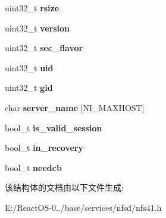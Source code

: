 \begin{DoxyCompactItemize}
uint32\+\_\+t {\bfseries rsize}
\item 
\mbox{\label{struct____nfs41__rpc__clnt_a8da4c1bb642a25efeba6a5e2e670d9fe}} 
uint32\+\_\+t {\bfseries version}
\item 
\mbox{\label{struct____nfs41__rpc__clnt_a90e5bc4c43ee7cadcc9f473e7a45bdad}} 
uint32\+\_\+t {\bfseries sec\+\_\+flavor}
\item 
\mbox{\label{struct____nfs41__rpc__clnt_a104fd677414a319da12861267e08ba13}} 
uint32\+\_\+t {\bfseries uid}
\item 
\mbox{\label{struct____nfs41__rpc__clnt_a13f13593e8b9767c440b4d67f61e9903}} 
uint32\+\_\+t {\bfseries gid}
\item 
\mbox{\label{struct____nfs41__rpc__clnt_a69a4437a29200da422de3aa9f1f31933}} 
char {\bfseries server\+\_\+name} \mbox{[}N\+I\+\_\+\+M\+A\+X\+H\+O\+ST\mbox{]}
\item 
\mbox{\label{struct____nfs41__rpc__clnt_a4cc080984672591bf0bbb3ae59abfc4f}} 
bool\+\_\+t {\bfseries is\+\_\+valid\+\_\+session}
\item 
\mbox{\label{struct____nfs41__rpc__clnt_a3616c8ed1cca8fbf4691379d2cf84e21}} 
bool\+\_\+t {\bfseries in\+\_\+recovery}
\item 
\mbox{\label{struct____nfs41__rpc__clnt_ae6ba5861124355463e69314386892e40}} 
bool\+\_\+t {\bfseries needcb}
\end{DoxyCompactItemize}


该结构体的文档由以下文件生成\+:\begin{DoxyCompactItemize}
\item 
E\+:/\+React\+O\+S-\/0../base/services/nfsd/nfs41.\+h\end{DoxyCompactItemize}

